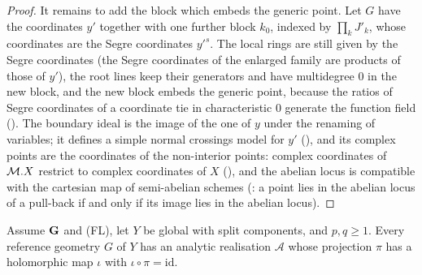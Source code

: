 \begin{proof}
It remains to add the block which embeds the generic point. Let $G$ have the coordinates $y'$ together with one
further block $k_0$, indexed by $\prod_kJ'_k$, whose coordinates are the Segre coordinates $y'^s$. The local rings
are still given by the Segre coordinates (the Segre coordinates of the enlarged family are products of those of
$y'$), the root lines keep their generators and have multidegree $0$ in the new block, and the new block embeds
the generic point, because the ratios of Segre coordinates of a coordinate tie in characteristic $0$ generate the
function field (). The boundary ideal is the image of the
one of $y$ under the renaming of variables; it defines a simple normal crossings model for $y'$
(), and its complex points are the coordinates of the
non-interior points: complex coordinates of $\mathcal M.X$ restrict to complex coordinates of $X$
(), and the abelian locus is compatible with the cartesian map
of semi-abelian schemes (: a point lies in
the abelian locus of a pull-back if and only if its image lies in the abelian locus).
\end{proof}

\begin{proposition}\label{pf:towergeo:holo}
Assume $\mathbf G$ and \textup{(FL)}, let $Y$ be global with split components, and $p,q\ge1$. Every reference
geometry $G$ of $Y$ has an analytic realisation $\mathcal A$ whose projection $\pi$ has a holomorphic map
$\iota$ with $\iota\circ\pi=\mathrm{id}$.
\end{proposition}

